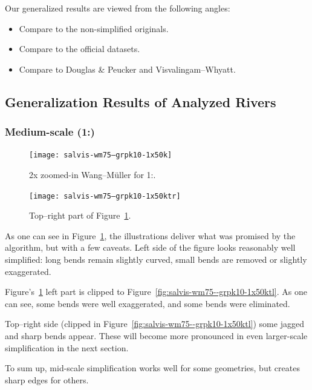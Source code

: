 \documentclass[a4paper]{article}
\newcommand{\DP}{Douglas \& Peucker}
\newcommand{\VW}{Visvalingam--Whyatt}
\newcommand{\WM}{Wang--M{\"u}ller}
\begin{document}
Our generalized results are viewed from the following angles:
\begin{itemize}
    \item Compare to the non-simplified originals.
    \item Compare to the official datasets.
    \item Compare to {\DP} and {\VW}.
\end{itemize}

\subsection{Generalization Results of Analyzed Rivers}
\label{sec:generalization-results-of-analyzed-rivers}

\subsubsection{Medium-scale (1:)}
\label{sec:analyzed-medium-scale}

\begin{figure}[h!]
    \centering
    \texttt{[image: salvis-wm75--grpk10-1x50k]}
    \caption{2x zoomed-in {\WM} for 1:.}
    \label{fig:salvis-wm75--grpk10-1x50k}
\end{figure}

\begin{figure}[h!]
    \centering
    \texttt{[image: salvis-wm75--grpk10-1x50ktr]}
    \caption{Top--right part of Figure~\ref{fig:salvis-wm75--grpk10-1x50k}.}
    \label{fig:salvis-wm75--grpk10-1x50ktr}
\end{figure}

As one can see in Figure~\ref{fig:salvis-wm75--grpk10-1x50k}, the illustrations deliver
what was promised by the algorithm, but with a few caveats. Left side of the
figure looks reasonably well simplified: long bends remain slightly curved,
small bends are removed or slightly exaggerated.

Figure's~\ref{fig:salvis-wm75--grpk10-1x50k} left part is clipped to
Figure~\ref{fig:salvis-wm75--grpk10-1x50ktl}. As one can see, some bends were well
exaggerated, and some bends were eliminated.

Top--right side (clipped in Figure~\ref{fig:salvis-wm75--grpk10-1x50ktl}) some jagged
and sharp bends appear. These will become more pronounced in even larger-scale
simplification in the next section.

To sum up, mid-scale simplification works well for some geometries, but creates
sharp edges for others.
\end{document}
